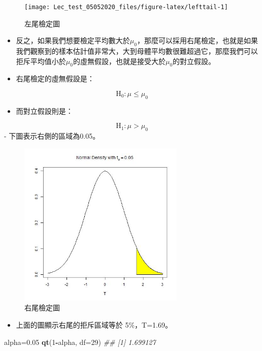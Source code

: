 \documentclass[hyperref,]{ctexart}
\newenvironment{Shaded}{\begin{snugshade}}{\end{snugshade}}
\newcommand{\CommentTok}[1]{\textcolor[rgb]{0.56,0.35,0.01}{\textit{#1}}}
\newcommand{\DataTypeTok}[1]{\textcolor[rgb]{0.13,0.29,0.53}{#1}}
\newcommand{\DecValTok}[1]{\textcolor[rgb]{0.00,0.00,0.81}{#1}}
\newcommand{\FloatTok}[1]{\textcolor[rgb]{0.00,0.00,0.81}{#1}}
\newcommand{\KeywordTok}[1]{\textcolor[rgb]{0.13,0.29,0.53}{\textbf{#1}}}
\newcommand{\NormalTok}[1]{#1}
\newcommand{\OperatorTok}[1]{\textcolor[rgb]{0.81,0.36,0.00}{\textbf{#1}}}
\providecommand{\tightlist}{%
  \setlength{\itemsep}{0pt}\setlength{\parskip}{0pt}}
\begin{document}
\begin{figure}

\texttt{[image: Lec\_test\_05052020\_files/figure-latex/lefttail-1]} \hfill{}

\caption{\label{fig:onetail1}左尾檢定圖}\label{fig:lefttail}
\end{figure}

\begin{itemize}
\item
  反之，如果我們想要檢定平均數大於\(\mu_{0}\)，那麼可以採用右尾檢定，也就是如果我們觀察到的樣本估計值非常大，大到母體平均數很難超過它，那麼我們可以拒斥平均值小於\(\mu_{0}\)的虛無假設，也就是接受大於\(\mu_{0}\)的對立假設。
\item
  右尾檢定的虛無假設是：
\end{itemize}

\[\text{H}_{\text{0}}: \mu\leq \mu_{0}\]

\begin{itemize}
\tightlist
\item
  而對立假設則是：
\end{itemize}

\[\text{H}_{\text{1}}: \mu > \mu_{0}\] - 下圖表示右側的區域為0.05。

\begin{figure}
\centering
\includegraphics[width=\textwidth,height=3.125in]{./Fig/t_alpha2.jpg}
\caption{右尾檢定圖}
\end{figure}

\begin{itemize}
\tightlist
\item
  上面的圖顯示右尾的拒斥區域等於 5\%，T=1.69。
\end{itemize}

\begin{Shaded}
\begin{Highlighting}[]
\NormalTok{alpha=}\FloatTok{0.05}
\KeywordTok{qt}\NormalTok{(}\DecValTok{1}\OperatorTok{-}\NormalTok{alpha, }\DataTypeTok{df=}\DecValTok{29}\NormalTok{)}
\CommentTok{## [1] 1.699127}
\end{Highlighting}
\end{Shaded}
\end{document}
